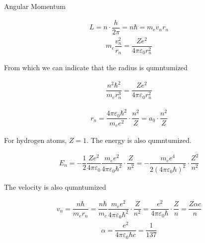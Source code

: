 Angular Momentum

\begin{equation*}
  \begin{aligned}
    L = n \cdot \dfrac{h}{2 \pi} = n \hbar = m_e v_n r_n
  \end{aligned}
\end{equation*}
\begin{equation*}
  \begin{aligned}
    m_e \dfrac{v_n^2}{r_n} = \dfrac{Z e^2}{4 \pi \varepsilon_0 r_n^2}  
  \end{aligned}
\end{equation*}

From which we can indicate that the radius is qumntumized

\begin{equation*}
  \begin{aligned}
    \dfrac{n^2 \hbar^2}{m_e r_n^3} = \dfrac{Z e^2}{4 \pi \varepsilon_0 r_n^2}
  \end{aligned}
\end{equation*}

\begin{equation*}
  \begin{aligned}
    r_n = \dfrac{4 \pi \varepsilon_0 \hbar^2}{m_e e^2} \cdot \dfrac{n^2}{Z} = a_0 \cdot \dfrac{n^2}{Z} 
  \end{aligned}
\end{equation*}

For hydrogen atoms, $Z = 1$. The energy is also qumntumized.

\begin{equation*}
  \begin{aligned}
    E_n = - \dfrac{1}{2} \dfrac{Z e^2}{4 \pi \varepsilon_0} \dfrac{m_e e^2}{4 \pi \varepsilon_0 \hbar^2} \cdot \dfrac{Z}{n^2} = - \dfrac{m_e e^4}{2 \left( 4 \pi \varepsilon_0 \hbar \right)^2} \cdot \dfrac{Z^2}{n^2} 
  \end{aligned}
\end{equation*}

The velocity is also qumntumized

\begin{equation*}
  \begin{aligned}
    v_n = \dfrac{n \hbar}{m_e r_n} = \dfrac{n \hbar}{m_e}  \dfrac{m_e e^2}{4 \pi \varepsilon_0 \hbar^2} \cdot \dfrac{Z}{n^2} = \dfrac{e^2}{4 \pi \varepsilon_0 \hbar} \cdot \dfrac{Z}{n} =
\dfrac{Z \alpha c}{n} 
  \end{aligned}
\end{equation*}
\begin{equation*}
  \begin{aligned}
    \alpha = \dfrac{e^2}{4 \pi \varepsilon_0 \hbar c} = \dfrac{1}{137}  
  \end{aligned}
\end{equation*}

